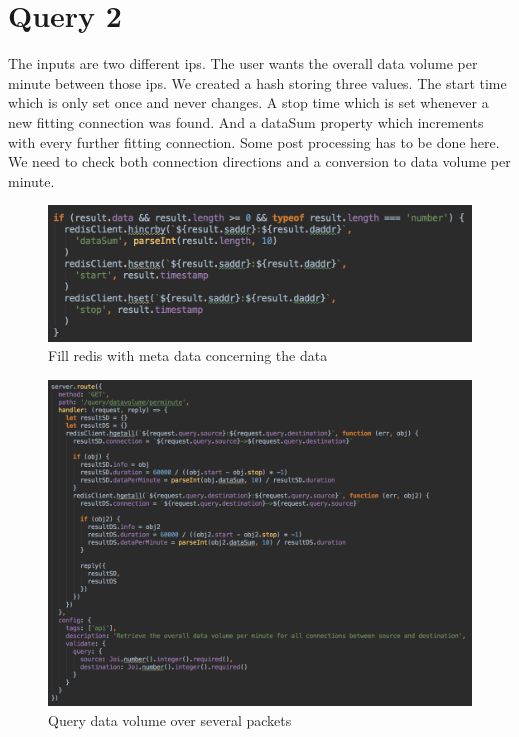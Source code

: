 \section{Query 2}
The inputs are two different ips. The user wants the overall data volume per minute between those ips. We created a hash storing three values. The start time which is only set once and never changes. A stop time which is set whenever a new fitting connection was found. And a dataSum property which increments with every further fitting connection. Some post processing has to be done here. We need to check both connection directions and a conversion to data volume per minute.

  \begin{figure}[H]
	\centerline{\includegraphics[width=1.0\textwidth]{resources/solution2-4.png}}
	\caption{Fill redis with meta data concerning the data}
	\label{query2}
\end{figure}

\begin{figure}[H]
	\centerline{\includegraphics[width=1.0\textwidth]{resources/solution2-5.png}}
	\caption{Query data volume over several packets}
	\label{query22}
\end{figure}

